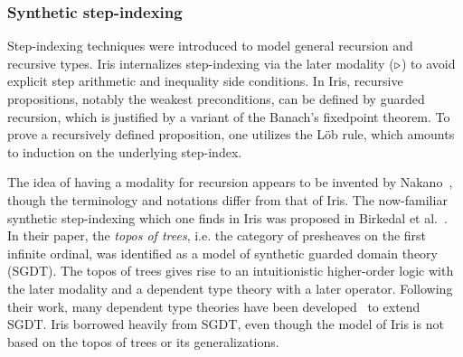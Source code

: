 \documentclass{article}
\theoremstyle{definition}
\theoremstyle{plain}
\theoremstyle{remark}
\begin{document}
\subsubsection{Synthetic step-indexing}
Step-indexing techniques were introduced to model general recursion and recursive types.
Iris internalizes step-indexing via the later modality (\(\mathop{\triangleright}\)) to avoid explicit step arithmetic and inequality side conditions.
In Iris, recursive propositions, notably the weakest preconditions, can be defined by guarded recursion, which is justified by a variant of the Banach's fixedpoint theorem.
To prove a recursively defined proposition, one utilizes the L\"ob rule, which amounts to induction on the underlying step-index.
The idea of having a modality for recursion appears to be invented by Nakano~\cite{nakano-grec}, though the terminology and notations differ from that of Iris.
The now-familiar synthetic step-indexing which one finds in Iris was proposed in Birkedal et al.~\cite{birkedal2012first}.
In their paper, the \emph{topos of trees}, i.e. the category of presheaves on the first infinite ordinal, was identified as a model of synthetic guarded domain theory (SGDT).
The topos of trees gives rise to an intuitionistic higher-order logic with the later modality and a dependent type theory with a later operator.
Following their work, many dependent type theories have been developed~\cite{birkedal2013intensional,bizjak2016guarded,birkedal2019guarded} to extend SGDT.
Iris borrowed heavily from SGDT, even though the model of Iris is not based on the topos of trees or its generalizations.
\end{document}
